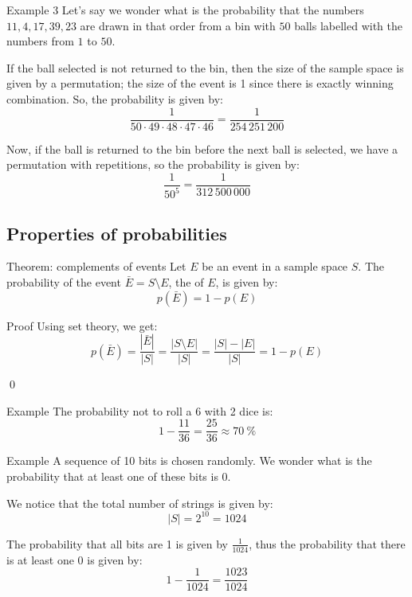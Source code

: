 \documentclass[a4paper]{article}
\begin{document}
\begin{parag}{Example 3}
    Let's say we wonder what is the probability that the numbers $11, 4, 17, 39, 23$ are drawn in that order from a bin with $50$ balls labelled with the numbers from $1$ to $50$. 

    If the ball selected is not returned to the bin, then the size of the sample space is given by a permutation; the size of the event is 1 since there is exactly winning combination. So, the probability is given by: 
    \[\frac{1}{50\cdot 49 \cdot 48 \cdot 47 \cdot 46} = \frac{1}{254\,251\,200}\]
    
    Now, if the ball is returned to the bin before the next ball is selected, we have a permutation with repetitions, so the probability is given by: 
    \[\frac{1}{50^{5}} = \frac{1}{312\,500\,000}\]
    
\end{parag}

\subsection{Properties of probabilities}
\begin{parag}{Theorem: complements of events}
    Let $E$ be an event in a sample space $S$. The probability of the event $\bar{E} = S \setminus E$, the  of $E$, is given by: 
    \[p\left(\bar{E}\right) = 1 - p\left(E\right)\]
    
    \begin{subparag}{Proof}
        Using set theory, we get: 
        \[p\left(\bar{E}\right) = \frac{\left|\bar{E}\right|}{\left|S\right|} = \frac{\left|S \setminus E\right|}{\left|S\right|} = \frac{\left|S\right| - \left|E\right|}{\left|S\right|} = 1 - p\left(E\right)\]

        \qed
    \end{subparag}
    
    \begin{subparag}{Example}
        The probability not to roll a 6 with 2 dice is: 
        \[1 - \frac{11}{36} = \frac{25}{36} \approx \SI{70}{\percent}\]
    \end{subparag}
\end{parag}

\begin{parag}{Example}
    A sequence of 10 bits is chosen randomly. We wonder what is the probability that at least one of these bits is 0.

    We notice that the total number of strings is given by: 
    \[\left|S\right| = 2^{10} = 1024\]
    
    The probability that all bits are 1 is given by $\frac{1}{1024}$, thus the probability that there is at least one 0 is given by: 
    \[1 - \frac{1}{1024} = \frac{1023}{1024}\]
    
\end{parag}
\end{document}
